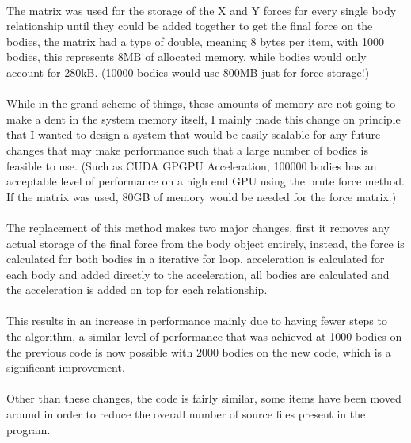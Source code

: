 \paragraph{}
The matrix was used for the storage of the X and Y forces for every single body relationship until they could be added together to get the final force on the bodies, the matrix had a type of double, meaning 8 bytes per item, with 1000 bodies, this represents 8MB of allocated memory, while bodies would only account for 280kB. (10000 bodies would use 800MB just for force storage!)

\paragraph{}
While in the grand scheme of things, these amounts of memory are not going to make a dent in the system memory itself, I mainly made this change on principle that I wanted to design a system that would be easily scalable for any future changes that may make performance such that a large number of bodies is feasible to use. (Such as CUDA GPGPU Acceleration, 100000 bodies has an acceptable level of performance on a high end GPU using the brute force method. If the matrix was used, 80GB of memory would be needed for the force matrix.)

\paragraph{}
The replacement of this method makes two major changes, first it removes any actual storage of the final force from the body object entirely, instead, the force is calculated for both bodies in a iterative for loop, acceleration is calculated for each body and added directly to the acceleration, all bodies are calculated and the acceleration is added on top for each relationship.

\paragraph{}
This results in an increase in performance mainly due to having fewer steps to the algorithm, a similar level of performance that was achieved at 1000 bodies on the previous code is now possible with 2000 bodies on the new code, which is a significant improvement.

\paragraph{}
Other than these changes, the code is fairly similar, some items have been moved around in order to reduce the overall number of source files present in the program.


